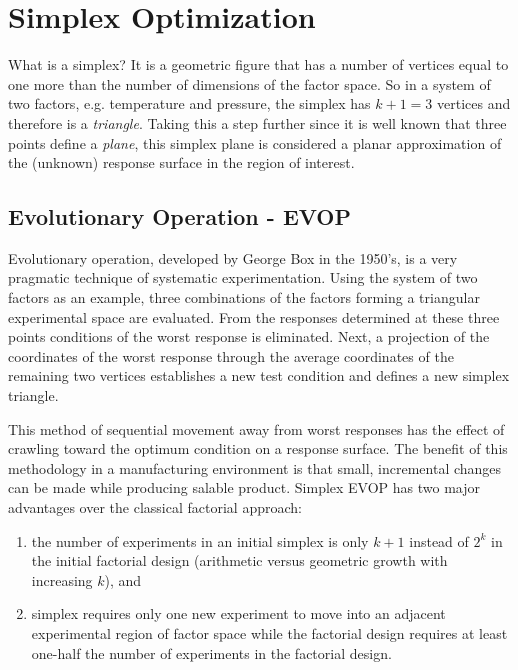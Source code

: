 \chapter{Simplex Optimization}

What is a simplex? It is a geometric figure that has a number of vertices equal to one more than the number of dimensions of the factor space. So in a system of two factors, e.g. temperature and pressure, the simplex has $k+1=3$ vertices and therefore is a \textit{triangle}. Taking this a step further since it is well known that three points define a \textit{plane}, this simplex plane is considered a planar approximation of the (unknown) response surface in the region of interest.

\section{Evolutionary Operation - EVOP}\label{evop}
Evolutionary operation, developed by George Box in the 1950's, is a very pragmatic technique of systematic experimentation.  Using the system of two factors as an example, three combinations of the factors forming a triangular experimental space are evaluated.  From the responses determined at these three points conditions of the worst response is eliminated.  Next, a projection of the coordinates of the worst response through the average coordinates of the remaining two vertices establishes a new test condition and defines a new simplex triangle.

This method of sequential movement away from worst responses has the effect of crawling toward the optimum condition on a response surface.  The benefit of this methodology in a manufacturing environment is that small, incremental changes can be made while producing salable product. Simplex EVOP has two major advantages over the classical factorial approach:

\begin{enumerate}
\item the number of experiments in an initial simplex is only $k+1$ instead of $2^{k}$ in the initial factorial design (arithmetic versus geometric growth with increasing $k$), and

\item simplex requires only one new experiment to move into an adjacent experimental region of factor space while the factorial design requires at least one-half the number of experiments in the factorial design.
\end{enumerate}


